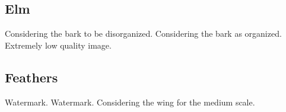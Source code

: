 \clearpage
\renewcommand{\mat}{Elm}
\subsection{\mat}

\renewcommand{\Number}{01}\InputImage{\sfl}{\tco}{\sexdi}{\tbu}{\sexdi}{\tbu}
{}{Considering the bark to be disorganized.}
\renewcommand{\Number}{02}\InputImage{\sfl}{\tco}{\sro}{\tbu}{\sro}{\tbu}
{}{}
\renewcommand{\Number}{03}\InputImage{\sfl}{\tco}{\sexdi}{\tbu}{\sexdi}{\tbu}
{}{}
\renewcommand{\Number}{04}\InputImage{\sfl}{\tco}{\sexdi}{\tbu}{\sexdi}{\tbu}
{}{}
\renewcommand{\Number}{05}\InputImage{\sfl}{\tco}{\sexdi}{\tbu}{\sexdi}{\tbu}
{}{}
\renewcommand{\Number}{06}\InputImage{\sfl}{\tco}{\sexor}{\tbu}{\sexor}{\tbu}
{}{Considering the bark as organized.}
\renewcommand{\Number}{07}\InputImage{\sfl}{\tco}{\sexdi}{\tbu}{\sexdi}{\tbu}
{}{}
\renewcommand{\Number}{08}\InputImage{\sfl}{\tco}{\sexdi}{\tbu}{\sexdi}{\tbu}
{}{}
\renewcommand{\Number}{09}\InputImage{\sfl}{\tco}{\sexdi}{\tbu}{\sexdi}{\tbu}
{}{}
\renewcommand{\Number}{10}\InputImage{\sfl}{\tco}{\sfl}{\tco}{\sexdi}{\tbu}
{}{}
\renewcommand{\Number}{11}\InputImage{\sfl}{\tco}{\sexdi}{\tbu}{\sexdi}{\tbu}
{Extremely low quality image.}{}
\renewcommand{\Number}{12}\InputImage{\sfl}{\tco}{\sro}{\tbu}{\sro}{\tbu}
{}{}

\clearpage
\renewcommand{\mat}{Feathers}
\subsection{\mat}

\renewcommand{\Number}{01}\InputImage{\sexor}{\tbu}{\sexor}{\tbu}{\sro}{\tfe}
{Watermark.}{}
\renewcommand{\Number}{02}\InputImage{\sexor}{\tbu}{\sexor}{\tbu}{\sro}{\tfe} 
{}{}
\renewcommand{\Number}{03}\InputImage{\sexor}{\tbu}{\sexor}{\tbu}{\sro}{\tfe} 
{}{}
\renewcommand{\Number}{04}\InputImage{\sexor}{\tbu}{\sexor}{\tbu}{\sexdi}{\tfe}
{}{}
\renewcommand{\Number}{05}\InputImage{\sexor}{\tbu}{\sro}{\tfe}{\sro}{\tfe}
{Watermark.}{}
\renewcommand{\Number}{06}\InputImage{\sfl}{\tsm}{\sro}{\tfe}{\sro}{\tfe}
{}{}
\renewcommand{\Number}{07}\InputImage{\sexor}{\tbu}{\sexdi}{\tfe}{\sexdi}{\tfe}
{}{}
\renewcommand{\Number}{08}\InputImage{\sexor}{\tbu}{\sexor}{\tbu}{\sexdi}{\tfe}
{}{}
\renewcommand{\Number}{09}\InputImage{\sexor}{\tbu}{\sexor}{\tbu}{\sexdi}{\tfe}
{}{}
\renewcommand{\Number}{10}\InputImage{\sfl}{\tsm}{\sro}{\tfe}{\sro}{\tfe}
{}{Considering the wing for the medium scale.}
\renewcommand{\Number}{11}\InputImage{\sexor}{\tbu}{\sexor}{\tfe}{\sexor}{\tfe}
{}{}
\renewcommand{\Number}{12}\InputImage{\sexor}{\tbu}{\sro}{\tfe}{\sro}{\tfe}
{}{}

